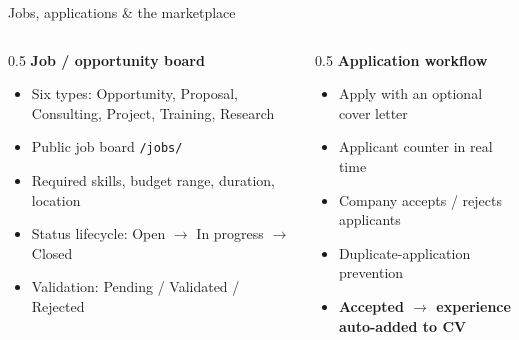 \documentclass[aspectratio=169, 10pt]{beamer}
\begin{document}
\begin{frame}{Jobs, applications \& the marketplace}
  \begin{columns}[T]
    \begin{column}{0.5\textwidth}
      \textbf{Job / opportunity board}
      \begin{itemize}
        \item Six types: Opportunity, Proposal, Consulting, Project, Training, Research
        \item Public job board \texttt{/jobs/}
        \item Required skills, budget range, duration, location
        \item Status lifecycle: Open $\rightarrow$ In progress $\rightarrow$ Closed
        \item Validation: Pending / Validated / Rejected
      \end{itemize}
    \end{column}
    \begin{column}{0.5\textwidth}
      \textbf{Application workflow}
      \begin{itemize}
        \item Apply with an optional cover letter
        \item Applicant counter in real time
        \item Company accepts / rejects applicants
        \item Duplicate-application prevention
        \item \textbf{Accepted $\rightarrow$ experience auto-added to CV}
      \end{itemize}
      \vspace{6pt}
      \begin{center}
      \end{center}
    \end{column}
  \end{columns}
\end{frame}
\end{document}
